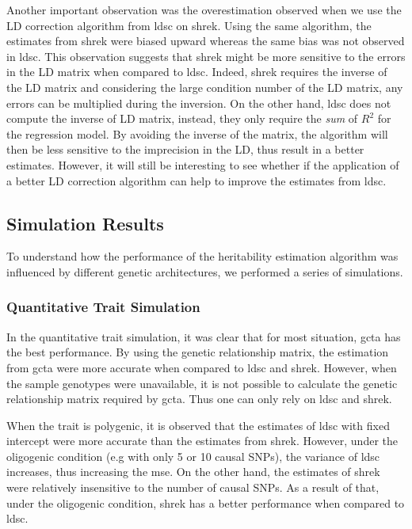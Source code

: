 	Another important observation was the overestimation observed when we use the \gls{LD} correction algorithm from \gls{ldsc} on \gls{shrek}. 
	Using the same algorithm, the estimates from \gls{shrek} were biased upward whereas the same bias was not observed in \gls{ldsc}.
	This observation suggests that \gls{shrek} might be more sensitive to the errors in the \gls{LD} matrix when compared to \gls{ldsc}.
	Indeed, \gls{shrek} requires the inverse of the \gls{LD} matrix and considering the large condition number of the \gls{LD} matrix, any errors can be multiplied during the inversion.
	On the other hand, \gls{ldsc} does not compute the inverse of \gls{LD} matrix, instead, they only require the \emph{sum} of $R^2$ for the regression model.
	By avoiding the inverse of the matrix, the algorithm will then be less sensitive to the imprecision in the \gls{LD}, thus result in a better estimates.
	However, it will still be interesting to see whether if the application of a better \gls{LD} correction algorithm can help to improve the estimates from \gls{ldsc}.
	

	\subsection{Simulation Results}
	To understand how the performance of the heritability estimation algorithm was influenced by different genetic architectures, we performed a series of simulations.
	
	\subsubsection{Quantitative Trait Simulation}
	In the quantitative trait simulation, it was clear that for most situation, \gls{gcta} has the best performance.
	By using the genetic relationship matrix, the estimation from \gls{gcta} were more accurate when compared to \gls{ldsc} and \gls{shrek}.
	However, when the sample genotypes were unavailable, it is not possible to calculate the genetic relationship matrix required by \gls{gcta}. 
	Thus one can only rely on \gls{ldsc} and \gls{shrek}.
	
	When the trait is polygenic, it is observed that the estimates of \gls{ldsc} with fixed intercept were more accurate than the estimates from \gls{shrek}. 
	However, under the oligogenic condition (e.g with only 5 or 10 causal \glspl{SNP}), the variance of \gls{ldsc} increases, thus increasing the \gls{mse}.
	On the other hand, the estimates of \gls{shrek} were relatively insensitive to the number of causal \glspl{SNP}.
	As a result of that, under the oligogenic condition, \gls{shrek} has a better performance when compared to \gls{ldsc}.
	
